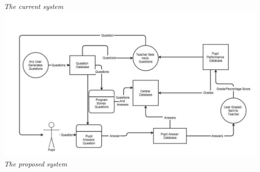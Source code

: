 \documentclass[a4paper,12pt]{report}
\begin{document}
\emph{The current system}\\
\includegraphics[scale=0.3]{NewSystem}\\
\emph{The proposed system}
\end{document}
